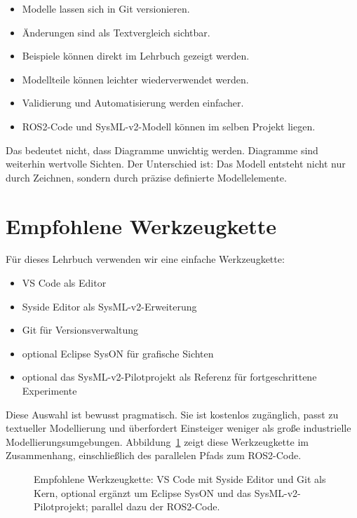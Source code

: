 \begin{itemize}
    \item Modelle lassen sich in Git versionieren.
    \item Änderungen sind als Textvergleich sichtbar.
    \item Beispiele können direkt im Lehrbuch gezeigt werden.
    \item Modellteile können leichter wiederverwendet werden.
    \item Validierung und Automatisierung werden einfacher.
    \item ROS2-Code und SysML-v2-Modell können im selben Projekt liegen.
\end{itemize}

Das bedeutet nicht, dass Diagramme unwichtig werden. Diagramme sind weiterhin wertvolle Sichten. Der Unterschied ist: Das Modell entsteht nicht nur durch Zeichnen, sondern durch präzise definierte Modellelemente.

\section{Empfohlene Werkzeugkette}
Für dieses Lehrbuch verwenden wir eine einfache Werkzeugkette:

\begin{itemize}
    \item VS Code als Editor
    \item Syside Editor als SysML-v2-Erweiterung
    \item Git für Versionsverwaltung
    \item optional Eclipse SysON für grafische Sichten
    \item optional das SysML-v2-Pilotprojekt als Referenz für fortgeschrittene Experimente
\end{itemize}

Diese Auswahl ist bewusst pragmatisch. Sie ist kostenlos zugänglich, passt zu textueller Modellierung und überfordert Einsteiger weniger als große industrielle Modellierungsumgebungen. Abbildung~\ref{fig:kap04-werkzeugkette} zeigt diese Werkzeugkette im Zusammenhang, einschließlich des parallelen Pfads zum ROS2-Code.

\begin{figure}[H]
  \centering
  \caption{Empfohlene Werkzeugkette: VS Code mit Syside Editor und Git als Kern, optional ergänzt um Eclipse SysON und das SysML-v2-Pilotprojekt; parallel dazu der ROS2-Code.}
  \label{fig:kap04-werkzeugkette}
\end{figure}

